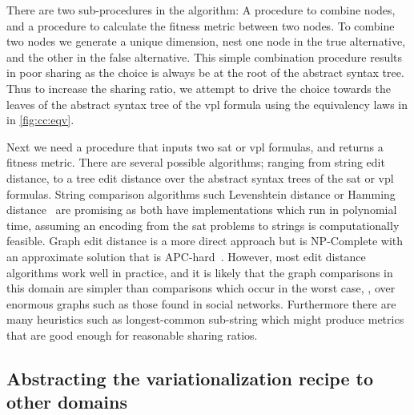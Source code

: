 There are two sub-procedures in the algorithm: A procedure to combine nodes, and
a procedure to calculate the fitness metric between two nodes. To combine two
nodes we generate a unique dimension, nest one node in the true alternative, and
the other in the false alternative. This simple combination procedure results in
poor sharing as the choice is always be at the root of the abstract syntax tree.
Thus to increase the sharing ratio, we attempt to drive the choice towards the
leaves of the abstract syntax tree of the \ac{vpl} formula using the equivalency
laws in in \autoref{fig:cc:eqv}.

Next we need a procedure that inputs two \ac{sat} or \ac{vpl} formulas, and
returns a fitness metric. There are several possible algorithms; ranging from
string edit distance, to a tree edit distance over the abstract syntax trees of
the \ac{sat} or \ac{vpl} formulas. String comparison algorithms such Levenshtein
distance\cite{Levenshtein_SPD66} or Hamming distance~\cite{H:BST50} are
promising as both have implementations which run in polynomial time, assuming an
encoding from the \ac{sat} problems to strings is computationally feasible.
Graph edit distance is a more direct approach but is NP-Complete with an
approximate solution that is APC-hard~\cite{hardnessOfGraphEditDistance}.
However, most edit distance algorithms work well in practice, and it is likely
that the graph comparisons in this domain are simpler than comparisons which
occur in the worst case, \eg{}, over enormous graphs such as those found in
social networks. Furthermore there are many heuristics such as longest-common
sub-string which might produce metrics that are good enough for reasonable
sharing ratios.

\subsection{Abstracting the variationalization recipe to other domains}


